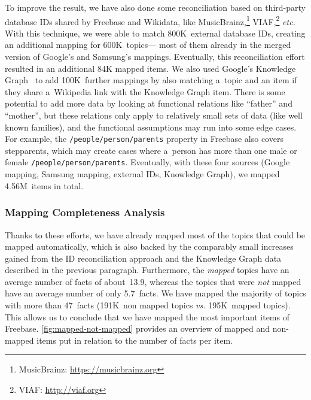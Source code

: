 \documentclass{acm_proc_article-sp}
\begin{document}
To improve the result, we have also done some reconciliation based on third-party database IDs
shared by Freebase and Wikidata, like MusicBrainz,\footnote{MusicBrainz: \url{https://musicbrainz.org}}
VIAF,\footnote{VIAF: \url{http://viaf.org}} \emph{etc.}
With this technique, we were able to match 800K~external database IDs,
creating an additional mapping for 600K~topics---%
most of them already in the merged version of Google's and Samsung's mappings.
Eventually, this reconciliation effort resulted in an additional 84K mapped items.
We also used Google's Knowledge Graph~\cite{singhal2012} to add 100K~further mappings
by also matching a~topic and an item if they share a~Wikipedia link with the Knowledge Graph item.
There is some potential to add more data by looking at functional relations
like ``father'' and ``mother'', but these relations only apply to relatively small sets of data
(like well known families), and the functional assumptions may run into some edge cases.
For example, the \texttt{/people/person/parents} property in Freebase also covers stepparents,
which may create cases where a~person has more than one male or female \texttt{/people/person/parents}.
Eventually, with these four sources (Google mapping, Samsung mapping, external IDs, Knowledge Graph),
we mapped 4.56M~items in total.

\subsubsection{Mapping Completeness Analysis}

Thanks to these efforts, we have already mapped most of the topics that could be mapped automatically,
which is also backed by the comparably small increases gained from the ID reconciliation approach 
and the Knowledge Graph data described in the previous paragraph.
Furthermore, the \emph{mapped} topics have an average number of facts of about~13.9,
whereas the topics that were \emph{not} mapped have an average number of only 5.7~facts.
We have mapped the majority of topics with more than 47~facts
(191K~non mapped topics \textit{vs.} 195K~mapped topics).
This allows us to conclude that we have mapped the most important items of Freebase.
\autoref{fig:mapped-not-mapped} provides an overview of mapped and non-mapped items
put in relation to the number of facts per item.
\end{document}
